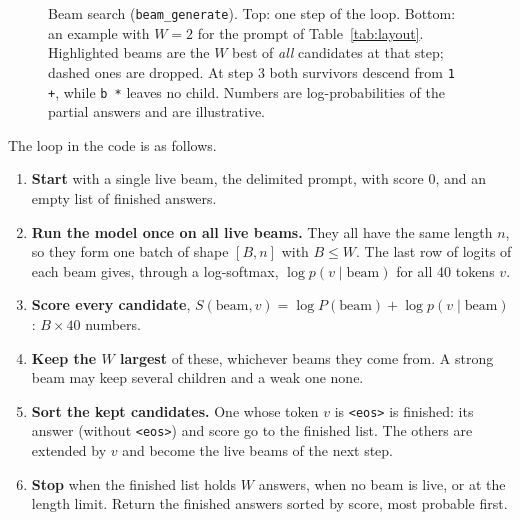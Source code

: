 \documentclass[11pt]{article}
\newcommand{\tok}[1]{\texttt{<#1>}}
\newcommand{\code}[1]{\texttt{#1}}
\begin{document}
\begin{figure}[t]
\caption{Beam search (\code{beam\_generate}). Top: one step of the loop. Bottom: an
  example with $W=2$ for the prompt of Table~\ref{tab:layout}. Highlighted beams are the
  $W$ best of \emph{all} candidates at that step; dashed ones are dropped. At step 3 both
  survivors descend from \code{1 +}, while \code{b *} leaves no child. Numbers are
  log-probabilities of the partial answers and are illustrative.}
\label{fig:beam}
\end{figure}

\noindent The loop in the code is as follows.
\begin{enumerate}
\item \textbf{Start} with a single live beam, the delimited prompt, with score 0, and an
  empty list of finished answers.
\item \textbf{Run the model once on all live beams.} They all have the same length $n$, so
  they form one batch of shape $[B,n]$ with $B\le W$. The last row of logits of each beam
  gives, through a log-softmax, $\log p(v\mid\text{beam})$ for all 40 tokens $v$.
\item \textbf{Score every candidate}, $S(\text{beam},v)=\log P(\text{beam})+\log
  p(v\mid\text{beam})$: $B\times40$ numbers.
\item \textbf{Keep the $W$ largest} of these, whichever beams they come from. A strong beam
  may keep several children and a weak one none.
\item \textbf{Sort the kept candidates.} One whose token $v$ is \tok{eos} is finished: its
  answer (without \tok{eos}) and score go to the finished list. The others are extended by
  $v$ and become the live beams of the next step.
\item \textbf{Stop} when the finished list holds $W$ answers, when no beam is live, or at
  the length limit. Return the finished answers sorted by score, most probable first.
\end{enumerate}
\end{document}

